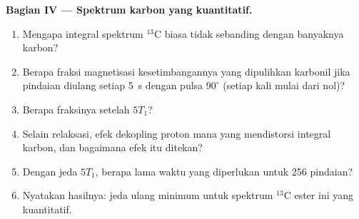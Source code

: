 \begin{problem}
\medskip\noindent\textbf{Bagian IV --- Spektrum karbon yang kuantitatif.}
\begin{enumerate}[resume, beginpenalty=10000]
  \item Mengapa integral spektrum ${}^{13}$C biasa tidak sebanding dengan
        banyaknya karbon?
  \item Berapa fraksi magnetisasi kesetimbangannya yang dipulihkan karbonil
        jika pindaian diulang setiap \qty{5}{s} dengan pulsa $90^\circ$ (setiap
        kali mulai dari nol)?
  \item Berapa fraksinya setelah $5T_1$?
  \item Selain relaksasi, efek dekopling proton mana yang mendistorsi integral
        karbon, dan bagaimana efek itu ditekan?
  \item Dengan jeda $5T_1$, berapa lama waktu yang diperlukan untuk 256
        pindaian?
  \item Nyatakan hasilnya: jeda ulang minimum untuk spektrum ${}^{13}$C ester
        ini yang kuantitatif.
\end{enumerate}
\end{problem}
